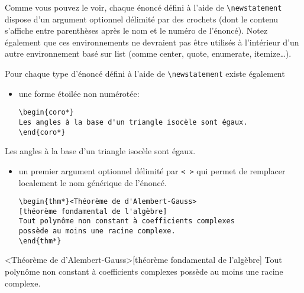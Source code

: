 \documentclass[french,ColorTheme=USAF,FontSize=10pt]{tango}
\newcommand\TO[1]{\textsf{#1}}
\begin{document}
Comme vous pouvez le voir, chaque énoncé défini à l'aide de \verb+\newstatement+ dispose d'un argument optionnel délimité par des crochets (dont le contenu s'affiche entre parenthèses après le nom et le numéro de l'énoncé). Notez également que ces environnements ne devraient pas être utilisés à l'intérieur d'un autre environnement basé sur \TO{list}  (comme \TO{center, quote, enumerate, itemize}…).

Pour chaque type d'énoncé défini à l'aide de  \verb+\newstatement+ existe également
\begin{itemize}
\item une forme étoilée non numérotée:
\begin{tcolorbox}
\begin{verbatim}
\begin{coro*}
Les angles à la base d'un triangle isocèle sont égaux.
\end{coro*}
\end{verbatim}
\end{tcolorbox}
\end{itemize}
\begin{coro*}
Les angles à la base d'un triangle isocèle sont égaux.
\end{coro*}
\begin{itemize}
\item  un premier argument optionnel délimité par \verb+< >+ qui permet de remplacer localement le nom générique de l'énoncé.
\begin{tcolorbox}
\begin{verbatim}
\begin{thm*}<Théorème de d'Alembert-Gauss>
[théorème fondamental de l'algèbre]
Tout polynôme non constant à coefficients complexes
possède au moins une racine complexe.
\end{thm*}
\end{verbatim}
\end{tcolorbox}
\end{itemize}
\begin{thm*}<Théorème de d'Alembert-Gauss>[théorème fondamental de l'algèbre]
Tout polynôme non constant à coefficients complexes possède au moins une racine complexe.
\end{thm*}
\end{document}
